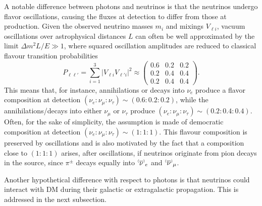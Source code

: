 A notable difference between photons and neutrinos is that the neutrinos undergo flavor oscillations, 
causing the fluxes at detection to differ from those at production.
Given the observed neutrino masses $m_i$ and mixings $V_{\ell i}$,
vacuum oscillations over astrophysical distances $L$ can often be
well approximated by the limit $\Delta m^2 L/E\gg 1$,
where squared oscillation amplitudes are reduced to  classical flavour transition probabilities~\cite{NuOsc}
\begin{equation}
P_{\ell\ell'}=\sum_{i=1}^3 |V_{\ell i} V_{\ell' i} |^2
\approx
\left( 
\begin{array}{ccc}
0.6 & 0.2 & 0.2 \\
0.2 & 0.4 & 0.4 \\
0.2 & 0.4 & 0.4 
\end{array}
\right).
\end{equation}
This means that, for instance, annihilations or decays into $\nu_e$  
produce a flavor composition at detection $(\nu_e : \nu_\mu : \nu_\tau) \sim (0.6 : 0.2 : 0.2)$, 
while the annihilations/decays into either $\nu_\mu$ or $\nu_\tau$ produce $(\nu_e : \nu_\mu : \nu_\tau) \sim(0.2 : 0.4 : 0.4)$. 
Often, for the sake of simplicity,  the assumption is made of democratic composition at detection 
$(\nu_e : \nu_\mu : \nu_\tau) \sim (1 : 1 : 1)$.
This flavour composition is preserved by oscillations
and is also motivated by the fact that a composition close to $(1 : 1 : 1)$ arises, after oscillations, 
if  neutrinos originate from pion decays in the source,
since $\pi^\pm$ decays equally into $\nubarnu_e$ and $\nubarnu_\mu$.

\smallskip

Another hypothetical difference with respect to photons is that neutrinos could interact with DM 
during their galactic or extragalactic propagation. This is addressed in the next subsection.

